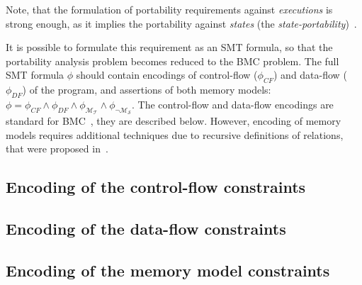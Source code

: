 Note, that the formulation of portability requirements against \textit{executions} is strong enough, as it implies the portability against \textit{states} (the \textit{state-portability})~\cite{Porthos17}.

It is possible to formulate this requirement as an SMT formula, so that the portability analysis problem becomes reduced to the BMC problem. The full SMT formula $\phi$ should contain encodings of control-flow ($\phi_{CF}$) and data-flow ($\phi_{DF}$) of the program, and assertions of both memory models: $\phi = \phi_{CF} \land \phi_{DF} \land \phi_{\mathcal{M_T}} \land \phi_{\lnot\mathcal{M_S}}$. The control-flow and data-flow encodings are standard for BMC~\cite{collavizza2006exploration}, they are described below. However, encoding of memory models requires additional techniques due to recursive definitions of relations, that were proposed in~\cite{Porthos17}.

\subsection{Encoding of the control-flow constraints}
\label{ch:port:enc:cf}


\subsection{Encoding of the data-flow constraints}
\label{ch:port:enc:cf}


\subsection{Encoding of the memory model constraints}
\label{ch:port:enc:wmm}

